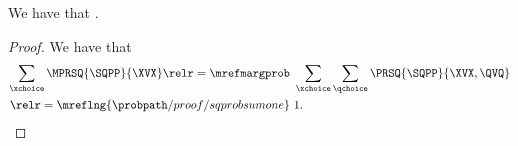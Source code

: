 \begin{proposition}
  We have that \sqmprobsumone.%
\end{proposition}

\begin{proof}
  We have that
  \begin{align*}
    \sum_{\xchoice}\MPRSQ{\SQPP}{\XVX} \relr = {\mrefmargprob} &\ \sum_{\xchoice}\sum_{\qchoice}\PRSQ{\SQPP}{\XVX, \QVQ}\\
   \relr  = {\mreflng{\probpath/proof/sqprobsumone}} &\ 1.
  \end{align*}
\end{proof}
